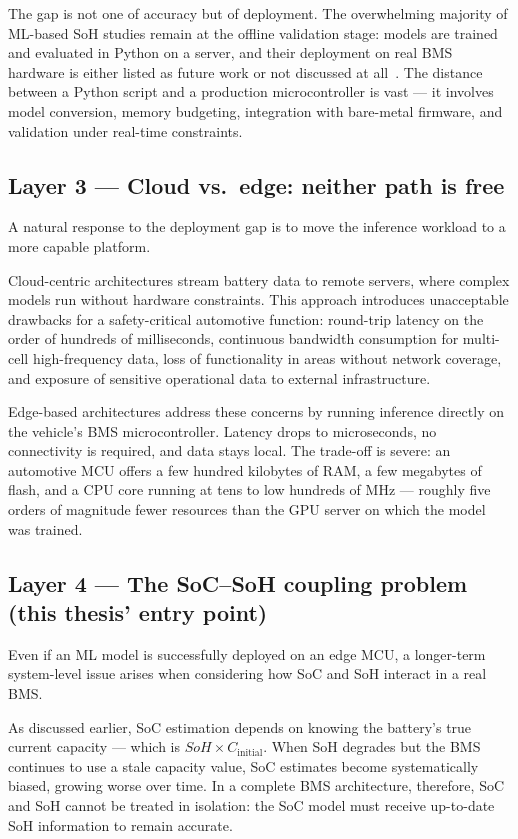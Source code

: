 The gap is not one of accuracy but of deployment. The overwhelming majority of ML-based SoH studies remain at the offline validation stage: models are trained and evaluated in Python on a server, and their deployment on real BMS hardware is either listed as future work or not discussed at all~\autocite{Nozarijouybari2024}. The distance between a Python script and a production microcontroller is vast — it involves model conversion, memory budgeting, integration with bare-metal firmware, and validation under real-time constraints.

\subsection*{Layer 3 --- Cloud vs.\ edge: neither path is free}

A natural response to the deployment gap is to move the inference workload to a more capable platform.

Cloud-centric architectures stream battery data to remote servers, where complex models run without hardware constraints. This approach introduces unacceptable drawbacks for a safety-critical automotive function: round-trip latency on the order of hundreds of milliseconds, continuous bandwidth consumption for multi-cell high-frequency data, loss of functionality in areas without network coverage, and exposure of sensitive operational data to external infrastructure.

Edge-based architectures address these concerns by running inference directly on the vehicle's BMS microcontroller. Latency drops to microseconds, no connectivity is required, and data stays local. The trade-off is severe: an automotive MCU offers a few hundred kilobytes of RAM, a few megabytes of flash, and a CPU core running at tens to low hundreds of MHz — roughly five orders of magnitude fewer resources than the GPU server on which the model was trained.

\subsection*{Layer 4 --- The SoC--SoH coupling problem (this thesis' entry point)}

Even if an ML model is successfully deployed on an edge MCU, a longer-term system-level issue arises when considering how SoC and SoH interact in a real BMS.

As discussed earlier, SoC estimation depends on knowing the battery's true current capacity — which is $SoH \times C_\text{initial}$. When SoH degrades but the BMS continues to use a stale capacity value, SoC estimates become systematically biased, growing worse over time. In a complete BMS architecture, therefore, SoC and SoH cannot be treated in isolation: the SoC model must receive up-to-date SoH information to remain accurate.

